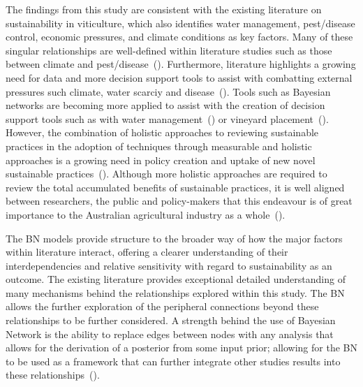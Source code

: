 \documentclass[fleqn,10pt]{wlscirep}
\begin{document}
The findings from this study are consistent with the existing literature on sustainability in viticulture, which also identifies water management, pest/disease control, economic pressures, and climate conditions as key factors. Many of these singular relationships are well-defined within literature studies such as those between climate and pest/disease~(\cite{olatinwoChapterWeatherbasedPest2014}). Furthermore, literature  highlights a growing need for data and more decision support tools to assist with combatting external pressures such climate, water scarciy and disease~(\cite{naigeonDATADecisionmakingViticulture2023,stefaniniBayesianCausalModel2022,fincoCombiningPrecisionViticulture2022a,laurentLocalInfluenceClimate2022}). Tools such as Bayesian networks are becoming more applied to assist with the creation of decision support tools such as with water management~(\cite{carmonaUseParticipatoryObjectOriented2011}) or vineyard placement~(\cite{abbalDecisionSupportSystem2016}). However, the combination of holistic approaches to reviewing sustainable practices in the adoption of techniques through measurable and holistic approaches is a growing need in policy creation and uptake of new novel sustainable practices~(\cite{mayfieldDesigningExpertledBayesian2023,baianoOverviewSustainabilityWine2021,dichiaraCollaborativeApproachAchieving2024}). Although more holistic approaches are required to review the total accumulated benefits of sustainable practices, it is well aligned between researchers, the public and policy-makers that this endeavour is of great importance to the Australian agricultural industry as a whole~(\cite{dumbrellComparingAustralianPublic2024}).

The BN models provide structure to the broader way of how the major factors within literature interact, offering a clearer understanding of their interdependencies and relative sensitivity with regard to sustainability as an outcome. The existing literature provides exceptional detailed understanding of many mechanisms behind the relationships explored within this study. The BN allows the further exploration of the peripheral connections beyond these relationships to be further considered. A strength behind the use of Bayesian Network is the ability to replace edges between nodes with any analysis that allows for the derivation of a posterior from some input prior; allowing for the BN to be used as a framework that can further integrate other studies results into these relationships~(\cite{kimphuctranMachineLearningProbabilistic2022,kollerObjectOrientedBayesianNetworks1997,korbBayesianArtificialIntelligence2011}).
\end{document}
